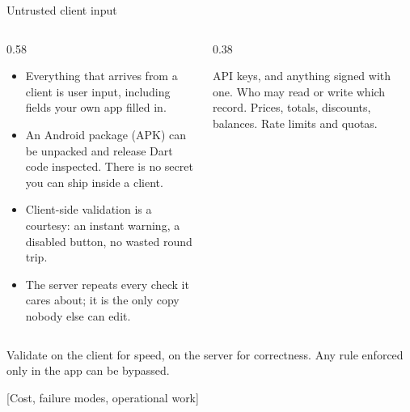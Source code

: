 \documentclass[10pt,aspectratio=169,t]{beamer}
\begin{document}
\begin{frame}[eyebrow=Server and client]{Untrusted client input}
  \begin{columns}[T]
    \begin{column}{0.58\textwidth}
      \begin{itemize}
        \item Everything that arrives from a client is user input, including fields your own app filled in.
        \item An Android package (APK) can be unpacked and release Dart code inspected. There is no secret you can ship inside a client.
        \item Client-side validation is a courtesy: an instant warning, a disabled button, no wasted round trip.
        \item The server repeats every check it cares about; it is the only copy nobody else can edit.
      \end{itemize}
    \end{column}
    \begin{column}{0.38\textwidth}
      \begin{hint}
        API keys, and anything signed with one. Who may read or write which record. Prices, totals, discounts, balances. Rate limits and quotas.
      \end{hint}
    \end{column}
  \end{columns}
  \begin{takeaway}{Validate on the client for speed, on the server for correctness.}
    Any rule enforced only in the app can be bypassed.
  \end{takeaway}
\end{frame}

[Cost, failure modes, operational work]
\end{document}
